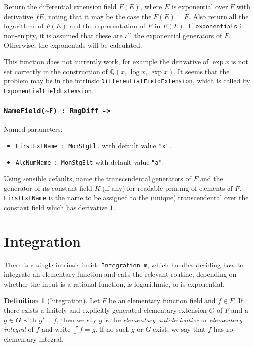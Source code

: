 \documentclass{article}
\theoremstyle{plain}
\theoremstyle{definition}
\newtheorem{definition}{Definition}
\newcommand{\Q}{\mathbb{Q}}
\begin{document}
\noindent Return the differential extension field $F(E)$, where $E$ is
exponential over $F$ with derivative $fE$, noting that it may be the case the
$F(E) = F$. Also return all the logarithms of $F(E)$ and the representation
of $E$ in $F(E)$. If \lstinline{exponentials} is non-empty, it is assumed
that these are all the exponential generators of $F$. Otherwise, the
exponentals will be calculated. \medbreak

This function does not currently work, for example the derivative of $\exp x$ is
not set correctly in the construction of $\Q(x,\, \log x,\, \exp x)$. It seems
that the problem may be in the intrinsic \lstinline{DifferentialFieldExtension},
which is called by \lstinline{ExponentialFieldExtension}.



\subsubsection*{\lstinline{NameField(~F) : RngDiff ->}}

Named parameters:
\begin{itemize}
    \item[] \lstinline{FirstExtName : MonStgElt} with default value
        \lstinline{"x"}.
    \item[] \lstinline{AlgNumName : MonStgElt} with default value
        \lstinline{"a"}.
\end{itemize}

\noindent Using sensible defaults, name the transcendental generators of $F$ and
the generator of its constant field $K$ (if any) for readable printing of
elements of $F$. \lstinline{FirstExtName} is the name to be assigned to the
(unique) transcendental over the constant field which has derivative $1$.

\section{Integration}
There is a single intrinsic inside \lstinline{Integration.m}, which handles
deciding how to integrate an elementary function and calls the relevant routine,
depending on whether the input is a rational function, is logarithmic, or is
exponential.

\begin{definition}[Integration] \label{elt_int}
    Let $F$ be an elementary function field and $f \in F$. If there exists a
    finitely and explicitly generated elementary extension $G$ of $F$ and a $g
    \in G$ with $g' = f$, then we say $g$ is the \emph{elementary
    antiderivative} or \emph{elementary integral} of $f$ and write $\int f =
    g$. If no such $g$ or $G$ exist, we say that $f$ has no elementary integral.
\end{definition}
\end{document}
